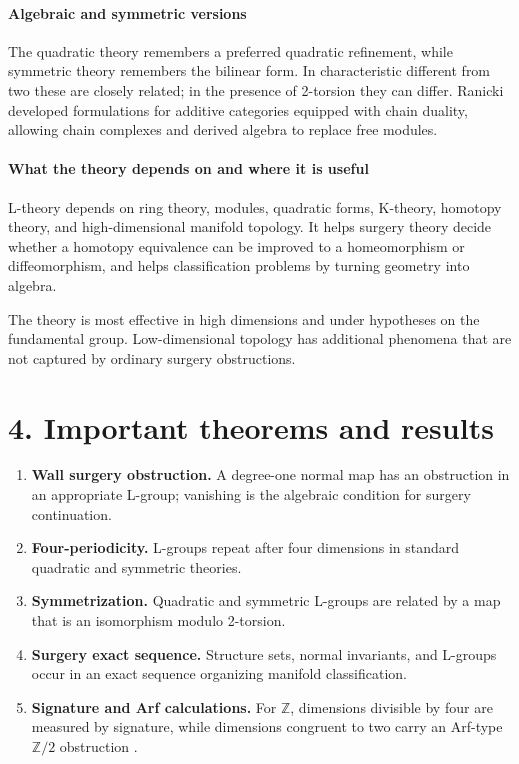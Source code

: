 \paragraph{Algebraic and symmetric versions}
The quadratic theory remembers a preferred quadratic refinement, while symmetric theory remembers the bilinear form. In characteristic different from two these are closely related; in the presence of 2-torsion they can differ. Ranicki developed formulations for additive categories equipped with chain duality, allowing chain complexes and derived algebra to replace free modules.

\paragraph{What the theory depends on and where it is useful}
L-theory depends on ring theory, modules, quadratic forms, K-theory, homotopy theory, and high-dimensional manifold topology. It helps surgery theory decide whether a homotopy equivalence can be improved to a homeomorphism or diffeomorphism, and helps classification problems by turning geometry into algebra.

The theory is most effective in high dimensions and under hypotheses on the fundamental group. Low-dimensional topology has additional phenomena that are not captured by ordinary surgery obstructions.

\section*{4. Important theorems and results}
\begin{enumerate}[leftmargin=*,itemsep=0.35em]
\item \textbf{Wall surgery obstruction.} A degree-one normal map has an obstruction in an appropriate L-group; vanishing is the algebraic condition for surgery continuation.

\item \textbf{Four-periodicity.} L-groups repeat after four dimensions in standard quadratic and symmetric theories.

\item \textbf{Symmetrization.} Quadratic and symmetric L-groups are related by a map that is an isomorphism modulo 2-torsion.

\item \textbf{Surgery exact sequence.} Structure sets, normal invariants, and L-groups occur in an exact sequence organizing manifold classification.

\item \textbf{Signature and Arf calculations.} For $\mathbb Z$, dimensions divisible by four are measured by signature, while dimensions congruent to two carry an Arf-type $\mathbb Z/2$ obstruction \cite{l_theory_ref1}.
\end{enumerate}

